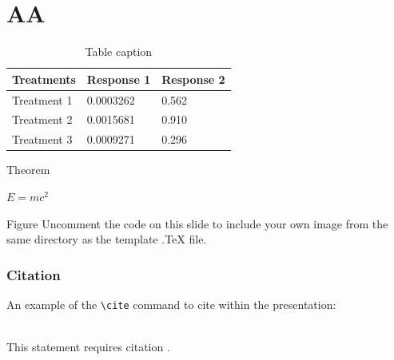 \documentclass[aspectratio=169,xcolor=dvipsnames]{beamer}
\begin{document}
\section{AA}

\begin{frame}{}
    \begin{table}
        \begin{tabular}{l l l}
            \toprule
            \textbf{Treatments} & \textbf{Response 1} & \textbf{Response 2} \\
            \midrule
            Treatment 1         & 0.0003262           & 0.562               \\
            Treatment 2         & 0.0015681           & 0.910               \\
            Treatment 3         & 0.0009271           & 0.296               \\
            \bottomrule
        \end{tabular}
        \caption{Table caption}
    \end{table}
\end{frame}


\begin{frame}{Theorem}
    \begin{theorem}
        $E = mc^2$
    \end{theorem}
\end{frame}


\begin{frame}{Figure}
    Uncomment the code on this slide to include your own image from the same directory as the template .TeX file.
\end{frame}


\begin{frame}[fragile] %
    \frametitle{Citation}
    An example of the \verb|\cite| command to cite within the presentation:\\~

    This statement requires citation \cite{p1}.
\end{frame}
\end{document}

